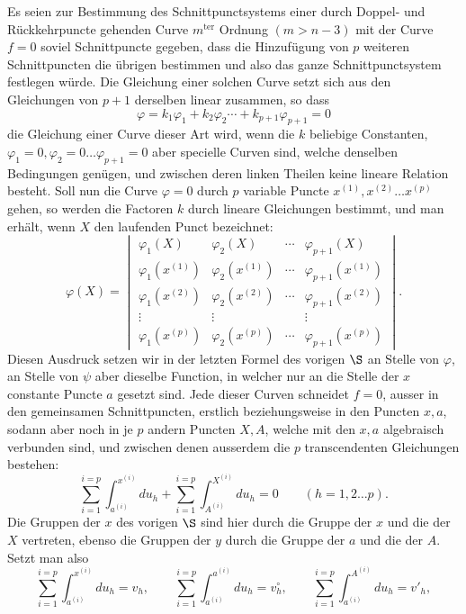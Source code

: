 \documentclass[10pt]{article}
\begin{document}
Es seien zur Bestimmung des Schnittpunctsystems einer durch Doppel- und Rückkehrpuncte gehenden Curve \(m^{\text{ter}}\) Ordnung \((m>n-3)\) mit der Curve \(f=0\) soviel Schnittpuncte gegeben, dass die Hinzufügung von \(p\) weiteren Schnittpuncten die übrigen bestimmen und also das ganze Schnittpunctsystem festlegen würde. Die Gleichung einer solchen Curve setzt sich aus den Gleichungen von \(p+1\) derselben linear zusammen, so dass
\[
\varphi=k_1\varphi_1+k_2\varphi_2\cdots+k_{p+1}\varphi_{p+1}=0
\]
die Gleichung einer Curve dieser Art wird, wenn die \(k\) beliebige Constanten, \(\varphi_1=0,\varphi_2=0\ldots\varphi_{p+1}=0\) aber specielle Curven sind, welche denselben Bedingungen genügen, und zwischen deren linken Theilen keine lineare Relation besteht. Soll nun die Curve \(\varphi=0\) durch \(p\) variable Puncte \(x^{(1)},x^{(2)}\ldots x^{(p)}\) gehen, so werden die Factoren \(k\) durch lineare Gleichungen bestimmt, und man erhält, wenn \(X\) den laufenden Punct bezeichnet:
\[
\tag{1}
\varphi(X)=
\begin{vmatrix}
\varphi_1(X) & \varphi_2(X) & \cdots & \varphi_{p+1}(X)\\
\varphi_1(x^{(1)}) & \varphi_2(x^{(1)}) & \cdots & \varphi_{p+1}(x^{(1)})\\
\varphi_1(x^{(2)}) & \varphi_2(x^{(2)}) & \cdots & \varphi_{p+1}(x^{(2)})\\
\vdots & \vdots & & \vdots\\
\varphi_1(x^{(p)}) & \varphi_2(x^{(p)}) & \cdots & \varphi_{p+1}(x^{(p)})
\end{vmatrix}.
\]
Diesen Ausdruck setzen wir in der letzten Formel des vorigen \(\S\) an Stelle von \(\varphi\), an Stelle von \(\psi\) aber dieselbe Function, in welcher nur an die Stelle der \(x\) constante Puncte \(a\) gesetzt sind. Jede dieser Curven schneidet \(f=0\), ausser in den gemeinsamen Schnittpuncten, erstlich beziehungsweise in den Puncten \(x,a\), sodann aber noch in je \(p\) andern Puncten \(X,A\), welche mit den \(x,a\) algebraisch verbunden sind, und zwischen denen ausserdem die \(p\) transcendenten Gleichungen bestehen:
\[
\tag{2}
\sum_{i=1}^{i=p}\int_{a^{(i)}}^{x^{(i)}}du_h+
\sum_{i=1}^{i=p}\int_{A^{(i)}}^{X^{(i)}}du_h=0
\qquad(h=1,2\ldots p).
\]
Die Gruppen der \(x\) des vorigen \(\S\) sind hier durch die Gruppe der \(x\) und die der \(X\) vertreten, ebenso die Gruppen der \(y\) durch die Gruppe der \(a\) und die der \(A\). Setzt man also
\[
\sum_{i=1}^{i=p}\int_{a^{(i)}}^{x^{(i)}}du_h=v_h,\qquad
\sum_{i=1}^{i=p}\int_{a^{(i)}}^{a^{(i)}}du_h=v_h^\circ,\qquad
\sum_{i=1}^{i=p}\int_{a^{(i)}}^{A^{(i)}}du_h=v'_h,
\]
\end{document}
